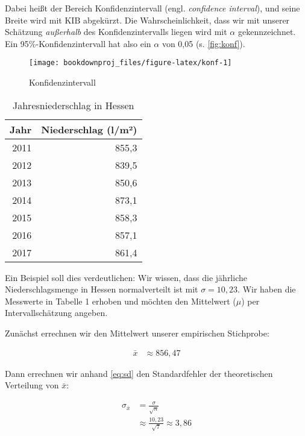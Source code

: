 \documentclass[
  ngerman,
]{article}
\begin{document}
Dabei heißt der Bereich Konfidenzintervall (engl. \emph{confidence interval}), und seine Breite wird mit \(\textrm{KIB}\) abgekürzt. Die Wahrscheinlichkeit, dass wir mit unserer Schätzung \emph{außerhalb} des Konfidenzintervalls liegen wird mit \(\alpha\) gekennzeichnet. Ein 95\%-Konfidenzintervall hat also ein \(\alpha\) von 0,05 (s. \autoref{fig:konf}).

\begin{figure}[h]

{\centering \texttt{[image: bookdownproj\_files/figure-latex/konf-1]} 

}

\caption{Konfidenzintervall}\label{fig:konf}
\end{figure}

\begin{table}

\caption{\label{tab:tab}Jahresniederschlag in Hessen}
\centering
\begin{tabular}[t]{rr}
\toprule
Jahr & Niederschlag (l/m²)\\
\midrule
2011 & 855,3\\
2012 & 839,5\\
2013 & 850,6\\
2014 & 873,1\\
2015 & 858,3\\
2016 & 857,1\\
2017 & 861,4\\
\bottomrule
\end{tabular}
\end{table}

Ein Beispiel soll dies verdeutlichen: Wir wissen, dass die jährliche Niederschlagsmenge in Hessen normalverteilt ist mit \(\sigma=10{,}23\). Wir haben die Messwerte in Tabelle 1 erhoben und möchten den Mittelwert (\(\mu\)) per Intervallschätzung angeben.

Zunächst errechnen wir den Mittelwert unserer empirischen Stichprobe:

\nopagebreak

\[\begin{aligned}
  \bar{x}&\approx856{,}47
\end{aligned}\]

Dann errechnen wir anhand \autoref{eq:sd} den Standardfehler der theoretischen Verteilung von \(\bar{x}\):

\nopagebreak

\[\begin{aligned}
\sigma_{\bar{x}}&=\frac{\sigma}{\sqrt{n}}\\[4pt]
           &\approx\frac{10{,}23}{\sqrt{7}}\approx3,86
\end{aligned}\]
\end{document}
